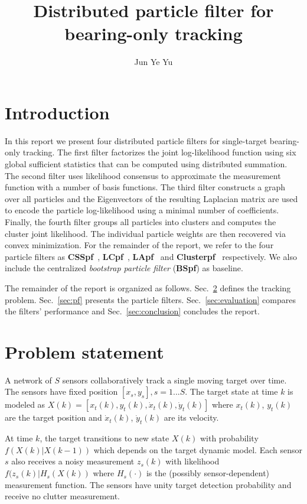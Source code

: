 \documentclass[10pt,letterpaper,final]{article}
\author{Jun Ye Yu}
\title{Distributed particle filter for bearing-only tracking}
\begin{document}
\maketitle

\section{Introduction}
In this report we present four distributed particle filters for single-target bearing-only tracking. The first filter factorizes the joint log-likelihood function using six global sufficient statistics that can be computed using distributed summation. The second filter uses likelihood consensus to approximate the measurement function with a number of basis functions. The third filter constructs a graph over all particles and the Eigenvectors of the resulting Laplacian matrix are used to encode the particle log-likelihood using a minimal number of coefficients. Finally, the fourth filter groups all particles into clusters and computes the cluster joint likelihood. The individual particle weights are then recovered via convex minimization. For the remainder of the report, we refer to the four particle filters as \textbf{CSSpf}~\cite{Mohammadi2012}, \textbf{LCpf}~\cite{Hlinka2012}, \textbf{LApf}~\cite{Rabbat2016} and \textbf{Clusterpf}~\cite{Chao2015} respectively. We also include the centralized \textit{bootstrap particle filter} (\textbf{BSpf}) as baseline. 

The remainder of the report is organized as follows. Sec.~\ref{sec:problem} defines the tracking problem. Sec.~\ref{sec:pf} presents the particle filters. Sec.~\ref{sec:evaluation} compares the filters' performance and Sec.~\ref{sec:conclusion} concludes the report. 

\section{Problem statement}
\label{sec:problem}
A network of $S$ sensors collaboratively track a single moving target over time. The sensors have fixed position $[x_s, y_s], s=1...S$. The target state at time $k$ is modeled as $X(k) = [x_t(k),y_t(k), \dot{x}_t(k), \dot{y}_t(k)]$ where $x_t(k)$, $y_t(k)$ are the target position and $\dot{x}_t(k)$, $\dot{y}_t(k)$ are its velocity. 

At time $k$, the target transitions to new state $X(k)$ with probability $f(X(k)|X(k-1))$ which depends on the target dynamic model. Each sensor $s$ also receives a noisy measurement $z_s(k)$ with likelihood $f(z_s(k)|H_s(X(k))$ where $H_s(\cdot)$ is the (possibly sensor-dependent) measurement function. The sensors have unity target detection probability and receive no clutter measurement. 
\end{document}
